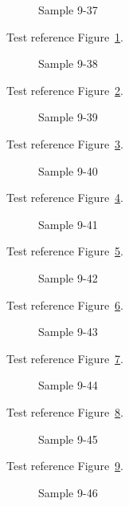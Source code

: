 \begin{figure}[tbhp]
\caption{Sample 9-37}
\label{fig:sample-9-37}
\end{figure}

Test reference Figure~\ref{fig:sample-9-37}.

\begin{figure}[tbhp]
\caption{Sample 9-38}
\label{fig:sample-9-38}
\end{figure}

Test reference Figure~\ref{fig:sample-9-38}.

\begin{figure}[tbhp]
\caption{Sample 9-39}
\label{fig:sample-9-39}
\end{figure}

Test reference Figure~\ref{fig:sample-9-39}.

\begin{figure}[tbhp]
\caption{Sample 9-40}
\label{fig:sample-9-40}
\end{figure}

Test reference Figure~\ref{fig:sample-9-40}.

\begin{figure}[tbhp]
\caption{Sample 9-41}
\label{fig:sample-9-41}
\end{figure}

Test reference Figure~\ref{fig:sample-9-41}.

\begin{figure}[tbhp]
\caption{Sample 9-42}
\label{fig:sample-9-42}
\end{figure}

Test reference Figure~\ref{fig:sample-9-42}.

\begin{figure}[tbhp]
\caption{Sample 9-43}
\label{fig:sample-9-43}
\end{figure}

Test reference Figure~\ref{fig:sample-9-43}.

\begin{figure}[tbhp]
\caption{Sample 9-44}
\label{fig:sample-9-44}
\end{figure}

Test reference Figure~\ref{fig:sample-9-44}.

\begin{figure}[tbhp]
\caption{Sample 9-45}
\label{fig:sample-9-45}
\end{figure}

Test reference Figure~\ref{fig:sample-9-45}.

\begin{figure}[tbhp]
\caption{Sample 9-46}
\label{fig:sample-9-46}
\end{figure}

